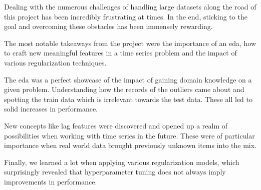 Dealing with the numerous challenges of handling large datasets along the road of this project has been incredibly frustrating at times. In the end, sticking to the goal and overcoming these obstacles has been immensely rewarding.

The most notable takeaways from the project were the importance of an \acrshort{eda}, how to craft new meaningful features in a time series problem and the impact of various regularization techniques.

The \acrshort{eda} was a perfect showcase of the impact of gaining domain knowledge on a given problem. Understanding how the records of the outliers came about and spotting the train data which is irrelevant towards the test data. 
These all led to solid increases in performance.

New concepts like lag features were discovered and opened up a realm of possibilities when working with time series in the future. These were of particular importance when real world data brought previously unknown items into the mix.

Finally, we learned a lot when applying various regularization models, which surprisingly revealed that \gls{hyperparameter} tuning does not always imply improvements in performance.
